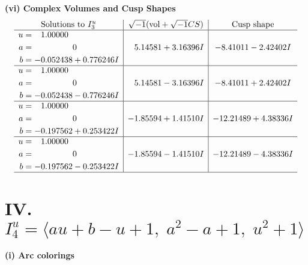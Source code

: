 \documentclass[1p]{elsarticle_modified}
\theoremstyle{definition}
\newcommand{\I}{\sqrt{-1}}
\begin{document}
\newpage\flushleft \textbf{(vi) Complex Volumes and Cusp Shapes}
$$\begin{array}{c|c|c}  
\text{Solutions to }I^u_{3}& \I (\text{vol} + \sqrt{-1}CS) & \text{Cusp shape}\\
 \hline 
\begin{aligned}
u &= \phantom{-}1.00000\phantom{ +0.000000I} \\
a &= \phantom{-0.000000 } 0 \\
b &= -0.052438 + 0.776246 I\end{aligned}
 & \phantom{-}5.14581 + 3.16396 I & -8.41011 - 2.42402 I \\ \hline\begin{aligned}
u &= \phantom{-}1.00000\phantom{ +0.000000I} \\
a &= \phantom{-0.000000 } 0 \\
b &= -0.052438 - 0.776246 I\end{aligned}
 & \phantom{-}5.14581 - 3.16396 I & -8.41011 + 2.42402 I \\ \hline\begin{aligned}
u &= \phantom{-}1.00000\phantom{ +0.000000I} \\
a &= \phantom{-0.000000 } 0 \\
b &= -0.197562 + 0.253422 I\end{aligned}
 & -1.85594 + 1.41510 I & -12.21489 + 4.38336 I \\ \hline\begin{aligned}
u &= \phantom{-}1.00000\phantom{ +0.000000I} \\
a &= \phantom{-0.000000 } 0 \\
b &= -0.197562 - 0.253422 I\end{aligned}
 & -1.85594 - 1.41510 I & -12.21489 - 4.38336 I\\
 \hline 
 \end{array}$$\newpage\newpage\renewcommand{\arraystretch}{1}
\centering \section*{IV. $I^u_{4}= \langle a u+b- u+1,\;a^2- a+1,\;u^2+1 \rangle$}
\flushleft \textbf{(i) Arc colorings}\\
\end{document}
